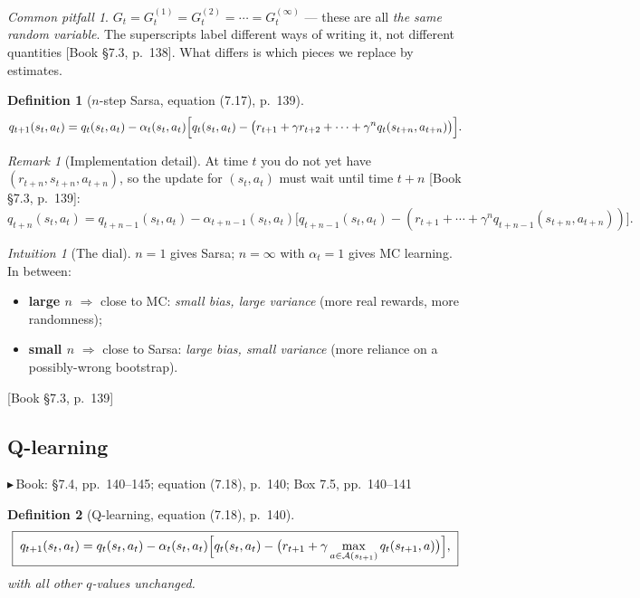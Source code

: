 \documentclass[11pt, letterpaper]{article}
\theoremstyle{runin}
\newtheorem*{definition}{Definition}
\theoremstyle{runinplain}
\theoremstyle{remark}
\newtheorem*{remark}{Remark}
\newtheorem*{warning}{Common pitfall}
\newtheorem*{intuition}{Intuition}
\newcommand{\Aspace}{\mathcal{A}}
\newcommand{\bk}[1]{{\color{bookblue}\small$\blacktriangleright$\,\textsf{Book: #1}}}
\newcommand{\bkin}[1]{{\color{bookblue}\small[\textsf{Book #1}]}}
\begin{document}
\begin{warning}
$G_t=G_t^{(1)}=G_t^{(2)}=\cdots=G_t^{(\infty)}$ --- these are all \emph{the same
random variable}. The superscripts label different ways of writing it, not different
quantities \bkin{\S7.3, p.~138}. What differs is which pieces we replace by
estimates.
\end{warning}

\begin{definition}[$n$-step Sarsa, equation (7.17), p.~139]
\[
  q_{t+1}(s_t,a_t)=q_t(s_t,a_t)-\alpha_t(s_t,a_t)
   \Bigl[q_t(s_t,a_t)-\bigl(r_{t+1}+\gamma r_{t+2}+\cdots+\gamma^nq_t(s_{t+n},a_{t+n})\bigr)\Bigr].
\]
\end{definition}

\begin{remark}[Implementation detail]
At time $t$ you do not yet have $(r_{t+n},s_{t+n},a_{t+n})$, so the update for
$(s_t,a_t)$ must wait until time $t+n$ \bkin{\S7.3, p.~139}:
\[
  q_{t+n}(s_t,a_t)=q_{t+n-1}(s_t,a_t)-\alpha_{t+n-1}(s_t,a_t)
   \bigl[q_{t+n-1}(s_t,a_t)-(r_{t+1}+\cdots+\gamma^nq_{t+n-1}(s_{t+n},a_{t+n}))\bigr].
\]
\end{remark}

\begin{intuition}[The dial]
$n=1$ gives Sarsa; $n=\infty$ with $\alpha_t=1$ gives MC learning. In between:
\begin{itemize}
  \item \textbf{large $n$} $\Rightarrow$ close to MC: \emph{small bias, large
        variance} (more real rewards, more randomness);
  \item \textbf{small $n$} $\Rightarrow$ close to Sarsa: \emph{large bias, small
        variance} (more reliance on a possibly-wrong bootstrap).
\end{itemize}
\bkin{\S7.3, p.~139}
\end{intuition}

\subsection{Q-learning}

\bk{\S7.4, pp.~140--145; equation (7.18), p.~140; Box 7.5, pp.~140--141}

\begin{definition}[Q-learning, equation (7.18), p.~140]
\[
  \boxed{\;
  q_{t+1}(s_t,a_t)=q_t(s_t,a_t)-\alpha_t(s_t,a_t)
    \Bigl[q_t(s_t,a_t)-\bigl(r_{t+1}+\gamma\max_{a\in\Aspace(s_{t+1})}q_t(s_{t+1},a)\bigr)\Bigr],\;}
\]
with all other $q$-values unchanged.
\end{definition}
\end{document}
